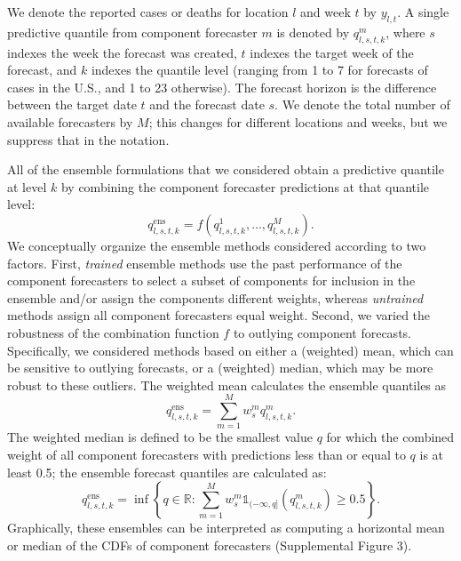 \documentclass[11pt,3p,review,authoryear]{elsarticle}
\def\ens{\mathrm{ens}}
\begin{document}
We denote the reported cases or deaths for location $l$ and week $t$ by $y_{l,t}$. A single predictive quantile from component forecaster $m$ is denoted by $q^m_{l,s,t,k}$, where $s$ indexes the week the forecast was created, $t$ indexes the target week of the forecast, and $k$ indexes the quantile level (ranging from 1 to 7 for forecasts of cases in the U.S., and 1 to 23 otherwise). The forecast horizon is the difference between the target date $t$ and the forecast date $s$. We denote the total number of available forecasters by $M$; this changes for different locations and weeks, but we suppress that in the notation.

All of the ensemble formulations that we considered obtain a predictive quantile at level $k$ by combining the component forecaster predictions at that quantile level:
$$
q^\ens_{l,s,t,k} = f(q^{1}_{l,s,t,k}, \ldots, q^{M}_{l,s,t,k}).
$$
We conceptually organize the ensemble methods considered according to two factors.
First, \textit{trained} ensemble methods use the past performance of the component forecasters to select a subset of components for inclusion in the ensemble and/or assign the components different weights, whereas \textit{untrained} methods assign all component forecasters equal weight.
Second, we varied the robustness of the combination function $f$ to outlying component forecasts.
Specifically, we considered methods based on either a (weighted) mean, which can be sensitive to outlying forecasts, or a (weighted) median, which may be more robust to these outliers.
The weighted mean calculates the ensemble quantiles as 
$$
q^\ens_{l,s,t,k} = \sum_{m = 1}^M w^m_{s} q^{m}_{l,s,t,k}.
$$
The weighted median is defined to be the smallest value $q$ for which the combined weight of all component forecasters with predictions less than or equal to $q$ is at least 0.5; the ensemble forecast quantiles are calculated as:
$$
q^\ens_{l,s,t,k} = \inf\left\{q \in \mathbb{R}: \sum_{m = 1}^M w^m_s \mathds{1}_{(-\infty, q]}(q^{m}_{l,s,t,k}) \geq 0.5\right\}.
$$
Graphically, these ensembles can be interpreted as computing a horizontal mean or median of the CDFs of component forecasters (Supplemental Figure 3).

\end{document}
